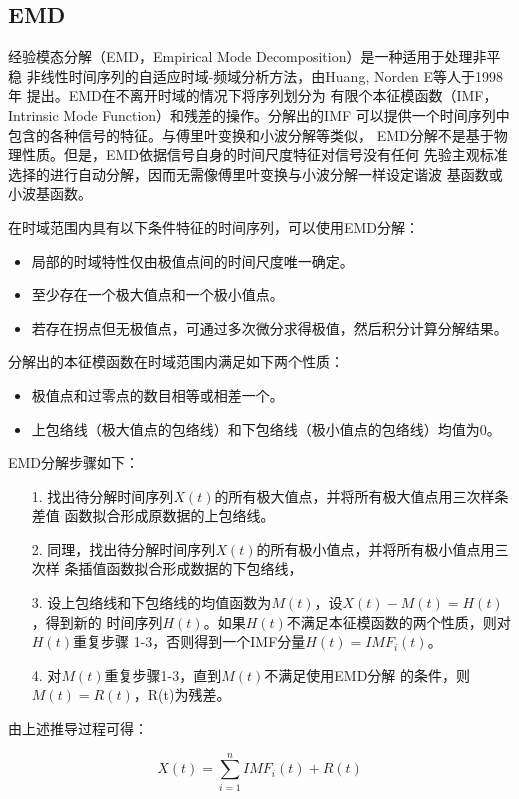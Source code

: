 \documentclass[AutoFakeBold]{LZUThesis}
\begin{document}
\subsection{EMD}
经验模态分解（EMD，Empirical Mode Decomposition）是一种适用于处理非平稳
非线性时间序列的自适应时域-频域分析方法，由Huang, Norden E等人于1998年
提出\cite{huang1998empirical}。EMD在不离开时域的情况下将序列划分为
有限个本征模函数（IMF，Intrinsic Mode Function）和残差的操作。分解出的IMF
可以提供一个时间序列中包含的各种信号的特征。与傅里叶变换和小波分解等类似，
EMD分解不是基于物理性质。但是，EMD依据信号自身的时间尺度特征对信号没有任何
先验主观标准选择的进行自动分解，因而无需像傅里叶变换与小波分解一样设定谐波
基函数或小波基函数。

在时域范围内具有以下条件特征的时间序列，可以使用EMD分解：
\begin{itemize}
\item 局部的时域特性仅由极值点间的时间尺度唯一确定。
\item 至少存在一个极大值点和一个极小值点。
\item 若存在拐点但无极值点，可通过多次微分求得极值，然后积分计算分解结果。
\end{itemize}

分解出的本征模函数在时域范围内满足如下两个性质：
\begin{itemize}
\item 极值点和过零点的数目相等或相差一个。
\item 上包络线（极大值点的包络线）和下包络线（极小值点的包络线）均值为0。
\end{itemize}

EMD分解步骤如下：
\begin{itemize}
\item[1. ] 找出待分解时间序列$X(t)$的所有极大值点，并将所有极大值点用三次样条差值
函数拟合形成原数据的上包络线。
\item[2. ] 同理，找出待分解时间序列$X(t)$的所有极小值点，并将所有极小值点用三次样
条插值函数拟合形成数据的下包络线，
\item[3. ] 设上包络线和下包络线的均值函数为$M(t)$，设$X(t)-M(t)=H(t)$，得到新的
时间序列$H(t)$。如果$H(t)$不满足本征模函数的两个性质，则对$H(t)$重复步骤
1-3，否则得到一个IMF分量$H(t)=IMF_i(t)$。
\item[4. ] 对$M(t)$重复步骤1-3，直到$M(t)$不满足使用EMD分解
的条件，则$M(t)=R(t)$，R(t)为残差。
\end{itemize}

由上述推导过程可得：

$$
X(t)=\displaystyle\sum_{i=1} ^n IMF_i(t) +R(t)
$$
\end{document}
